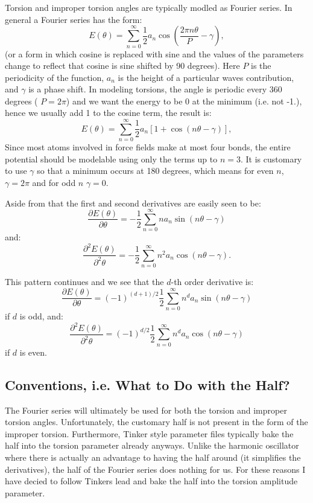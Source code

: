 Torsion and improper torsion angles are typically modled as Fourier series. In general a Fourier series has the form\+: \[ E(\theta)=\sum_{n=0}^\infty \frac{1}{2}a_n \cos\left(\frac{2\pi n\theta}{P}-\gamma\right), \] (or a form in which cosine is replaced with sine and the values of the parameters change to reflect that cosine is sine shifted by 90 degrees). Here $P$ is the periodicity of the function, $a_n$ is the height of a particular wave\textquotesingle{}s contribution, and $\gamma$ is a phase shift. In modeling torsions, the angle is periodic every 360 degrees ( $P=2\pi$) and we want the energy to be 0 at the minimum (i.\+e. not -\/1.), hence we usually add 1 to the cosine term, the result is\+: \[ E(\theta)=\sum_{n=0}^\infty \frac{1}{2}a_n\left[1+\cos\left(n\theta-\gamma\right)\right], \] Since most atoms involved in force fields make at most four bonds, the entire potential should be modelable using only the terms up to $n=3$. It is customary to use $\gamma$ so that a minimum occurs at 180 degrees, which means for even $n$, $\gamma=2\pi$ and for odd $n$ $\gamma=0$.

Aside from that the first and second derivatives are easily seen to be\+: \[ \frac{\partial E(\theta)}{\partial \theta}=-\frac{1}{2}\sum_{n=0}^\infty n a_n\sin(n\theta-\gamma) \] and\+: \[ \frac{\partial^2 E(\theta)}{\partial^2 \theta}=-\frac{1}{2}\sum_{n=0}^\infty n^2 a_n\cos(n\theta-\gamma). \]

This pattern continues and we see that the $d$-\/th order derivative is\+: \[ \frac{\partial E(\theta)}{\partial \theta}=(-1)^{(d+1)/2}\frac{1}{2}\sum_{n=0}^\infty n^d a_n\sin(n\theta-\gamma) \] if $d$ is odd, and\+: \[ \frac{\partial^2 E(\theta)}{\partial^2 \theta}=(-1)^{d/2}\frac{1}{2}\sum_{n=0}^\infty n^d a_n\cos(n\theta-\gamma) \] if $d$ is even.

\subsection*{Conventions, i.\+e. What to Do with the Half?}

The Fourier series will ultimately be used for both the torsion and improper torsion angles. Unfortunately, the customary half is not present in the form of the improper torsion. Furthermore, Tinker style parameter files typically bake the half into the torsion parameter already anyways. Unlike the harmonic oscillator where there is actually an advantage to having the half around (it simplifies the derivatives), the half of the Fourier series does nothing for us. For these reasons I have decied to follow Tinker\textquotesingle{}s lead and bake the half into the torsion amplitude parameter.

